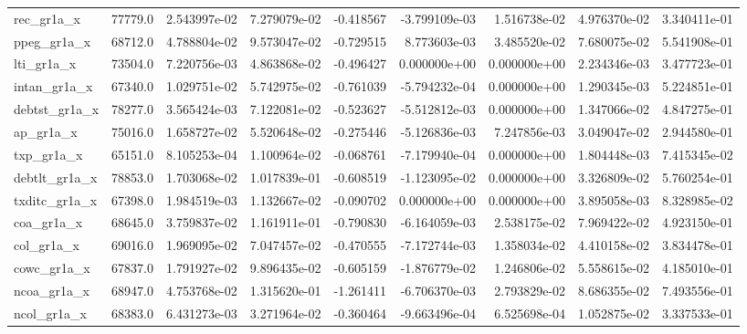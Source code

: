 \documentclass[10pt]{article}
\begin{document}
\begin{landscape}
\begin{longtable}{lrrrrrrrr}
rec\_gr1a\_x              &   77779.0 &  2.543997e-02 &  7.279079e-02 &     -0.418567 & -3.799109e-03 &  1.516738e-02 &  4.976370e-02 &  3.340411e-01 \\
ppeg\_gr1a\_x             &   68712.0 &  4.788804e-02 &  9.573047e-02 &     -0.729515 &  8.773603e-03 &  3.485520e-02 &  7.680075e-02 &  5.541908e-01 \\
lti\_gr1a\_x              &   73504.0 &  7.220756e-03 &  4.863868e-02 &     -0.496427 &  0.000000e+00 &  0.000000e+00 &  2.234346e-03 &  3.477723e-01 \\
intan\_gr1a\_x            &   67340.0 &  1.029751e-02 &  5.742975e-02 &     -0.761039 & -5.794232e-04 &  0.000000e+00 &  1.290345e-03 &  5.224851e-01 \\
debtst\_gr1a\_x           &   78277.0 &  3.565424e-03 &  7.122081e-02 &     -0.523627 & -5.512812e-03 &  0.000000e+00 &  1.347066e-02 &  4.847275e-01 \\
ap\_gr1a\_x               &   75016.0 &  1.658727e-02 &  5.520648e-02 &     -0.275446 & -5.126836e-03 &  7.247856e-03 &  3.049047e-02 &  2.944580e-01 \\
txp\_gr1a\_x              &   65151.0 &  8.105253e-04 &  1.100964e-02 &     -0.068761 & -7.179940e-04 &  0.000000e+00 &  1.804448e-03 &  7.415345e-02 \\
debtlt\_gr1a\_x           &   78853.0 &  1.703068e-02 &  1.017839e-01 &     -0.608519 & -1.123095e-02 &  0.000000e+00 &  3.326809e-02 &  5.760254e-01 \\
txditc\_gr1a\_x           &   67398.0 &  1.984519e-03 &  1.132667e-02 &     -0.090702 &  0.000000e+00 &  0.000000e+00 &  3.895058e-03 &  8.328985e-02 \\
coa\_gr1a\_x              &   68645.0 &  3.759837e-02 &  1.161911e-01 &     -0.790830 & -6.164059e-03 &  2.538175e-02 &  7.969422e-02 &  4.923150e-01 \\
col\_gr1a\_x              &   69016.0 &  1.969095e-02 &  7.047457e-02 &     -0.470555 & -7.172744e-03 &  1.358034e-02 &  4.410158e-02 &  3.834478e-01 \\
cowc\_gr1a\_x             &   67837.0 &  1.791927e-02 &  9.896435e-02 &     -0.605159 & -1.876779e-02 &  1.246806e-02 &  5.558615e-02 &  4.185010e-01 \\
ncoa\_gr1a\_x             &   68947.0 &  4.753768e-02 &  1.315620e-01 &     -1.261411 & -6.706370e-03 &  2.793829e-02 &  8.686355e-02 &  7.493556e-01 \\
ncol\_gr1a\_x             &   68383.0 &  6.431273e-03 &  3.271964e-02 &     -0.360464 & -9.663496e-04 &  6.525698e-04 &  1.052875e-02 &  3.337533e-01 \\

\end{longtable}
\end{landscape}
\end{document}
